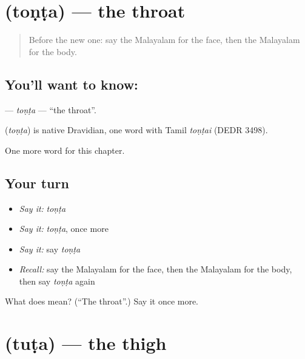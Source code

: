 \section[\texorpdfstring{\ml{തൊണ്ട} (toṇṭa)}{തൊണ്ട (toṇṭa)}]{ (toṇṭa) — the throat}

\label{lesson:ML-C192-tonta}



\begin{quote}
Before the new one: say the Malayalam for the face, then the Malayalam for the body.
\end{quote}

\subsection*{You'll want to know: }
\textbf{} — \emph{toṇṭa} — \textquotedblleft{}the throat\textquotedblright{}.

\begin{cousinweb}
\textbf{} (\emph{toṇṭa}) is native Dravidian, one word with Tamil \emph{toṇṭai} (DEDR 3498).
\end{cousinweb}

\begin{grammarlens}[title={What you've built}]
One more word for this chapter.
\end{grammarlens}

\subsection*{Your turn}
\begin{itemize}
\raggedright
  \item \emph{Say it:} \emph{toṇṭa}
  \item \emph{Say it:} \emph{toṇṭa}, once more
  \item \emph{Say it:} say \emph{toṇṭa}
  \item \emph{Recall:} say the Malayalam for the face, then the Malayalam for the body, then say \emph{toṇṭa} again
\end{itemize}

\begin{tcolorbox}[breakable,colback=teal!4,colframe=teal!35!black,title={Before you move on}]
What does  mean? (\textquotedblleft{}The throat\textquotedblright{}.) Say it once more.
\end{tcolorbox}
\section[\texorpdfstring{\ml{തുട} (tuṭa)}{തുട (tuṭa)}]{ (tuṭa) — the thigh}

